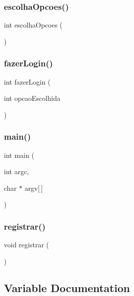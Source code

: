\mbox{\label{main_8cpp_aeab4fbfecea7e1546371af4bb6b0334b}} 
\subsubsection{escolha\+Opcoes()}
{\footnotesize\ttfamily int escolha\+Opcoes (\begin{DoxyParamCaption}{ }\end{DoxyParamCaption})}

\mbox{\label{main_8cpp_a68afbdf12fc34a2ab5a7b3d4dc1514bc}} 
\subsubsection{fazer\+Login()}
{\footnotesize\ttfamily int fazer\+Login (\begin{DoxyParamCaption}\item[{int}]{opcao\+Escolhida }\end{DoxyParamCaption})}

\mbox{\label{main_8cpp_a0ddf1224851353fc92bfbff6f499fa97}} 
\subsubsection{main()}
{\footnotesize\ttfamily int main (\begin{DoxyParamCaption}\item[{int}]{argc,  }\item[{char $\ast$}]{argv[$\,$] }\end{DoxyParamCaption})}

\mbox{\label{main_8cpp_a5fbd98e0a9b8948df8b40dd30dadf637}} 
\subsubsection{registrar()}
{\footnotesize\ttfamily void registrar (\begin{DoxyParamCaption}{ }\end{DoxyParamCaption})}



\subsection{Variable Documentation}
\mbox{\label{main_8cpp_a075537fa9922787c818bad092a25c5a6}} 
